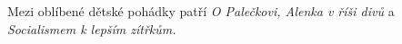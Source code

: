 Mezi oblíbené dětské pohádky patří \emph{O Palečkovi,
Alenka v říši divů} a \emph{Socialismem k lepším zítřkům.}